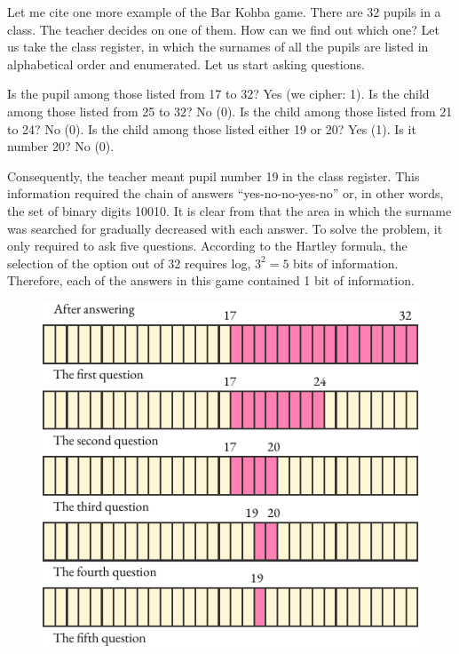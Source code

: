 Let me cite one more example of the Bar Kohba game. There are 32
pupils in a class. The teacher decides on one of them. How can we find
out which one? Let us take the class register, in which the surnames of
all the pupils are listed in alphabetical order and enumerated. Let us
start asking questions.
\begin{dialogue}
\ques Is the pupil among those listed from 17 to 32? 
\ans Yes (we cipher: 1).
\ques Is the child among those listed from 25 to 32?
\ans No (0). 
\ques Is the child among those listed from 21 to 24?
\ans No (0). 
\ques Is the child among those listed either 19 or 20?
\ans Yes (1).
\ques Is it number 20?
\ans No (0).
\end{dialogue}
Consequently, the teacher meant pupil number 19 in the class register.
This information required the chain of answers ``yes-no-no-yes-no'' or, in
other words, the set of binary digits 10010. It is clear from  that the area in which the surname was searched for gradually decreased
with each answer. To solve the problem, it only required to ask five
questions. According to the Hartley formula, the selection of the option
out of 32 requires log, $3^{2} = 5$ bits of information. Therefore, each of the
answers in this game contained 1 bit of information.
\begin{figure}[!ht]
 \centering
 \includegraphics[width=0.85\linewidth]{figures/32-pupils.pdf}
 \end{figure}

